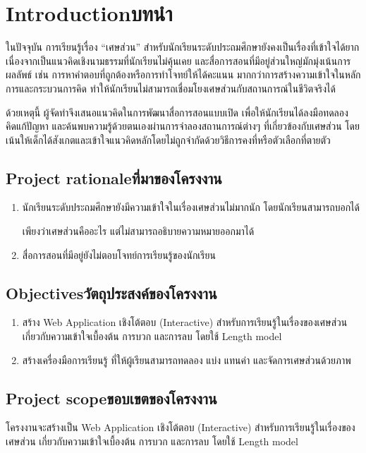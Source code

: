 \chapter{\ifenglish Introduction\else บทนำ\fi}
ในปัจจุบัน การเรียนรู้เรื่อง “เศษส่วน” สำหรับนักเรียนระดับประถมศึกษายังคงเป็นเรื่องที่เข้าใจได้ยาก เนื่องจากเป็นแนวคิดเชิงนามธรรมที่นักเรียนไม่คุ้นเคย และสื่อการสอนที่มีอยู่ส่วนใหญ่มักมุ่งเน้นการผลลัพธ์ เช่น การหาคำตอบที่ถูกต้องหรือการทำโจทย์ให้ได้คะแนน มากกว่าการสร้างความเข้าใจในหลักการและกระบวนการคิด ทำให้นักเรียนไม่สามารถเชื่อมโยงเศษส่วนกับสถานการณ์ในชีวิตจริงได้

ด้วยเหตุนี้ ผู้จัดทำจึงเสนอแนวคิดในการพัฒนาสื่อการสอนแบบเปิด เพื่อให้นักเรียนได้ลงมือทดลอง คิดแก้ปัญหา และค้นพบความรู้ด้วยตนเองผ่านการจำลองสถานการณ์ต่างๆ ที่เกี่ยวข้องกับเศษส่วน โดยเน้นให้เด็กได้สังเกตและเข้าใจแนวคิดหลักโดยไม่ถูกจำกัดด้วยวิธีการคงที่หรือตัวเลือกที่ตายตัว

\section{\ifenglish Project rationale\else ที่มาของโครงงาน\fi}
\begin{enumerate}
    \item นักเรียนระดับประถมศึกษายังมีความเข้าใจในเรื่องเศษส่วนไม่มากนัก โดยนักเรียนสามารถบอกได้
    
    เพียงว่าเศษส่วนคืออะไร แต่ไม่สามารถอธิบายความหมายออกมาได้
    \item สื่อการสอนที่มีอยู่ยังไม่ตอบโจทย์การเรียนรู้ของนักเรียน
\end{enumerate}

\section{\ifenglish Objectives\else วัตถุประสงค์ของโครงงาน\fi}
\begin{enumerate}
    \item สร้าง Web Application เชิงโต้ตอบ (Interactive) สำหรับการเรียนรู้ในเรื่องของเศษส่วน เกี่ยวกับความเข้าใจเบื้องต้น การบวก และการลบ โดยใช้ Length model
    \item สร้างเครื่องมือการเรียนรู้ ที่ให้ผู้เรียนสามารถทดลอง แบ่ง แทนค่า และจัดการเศษส่วนด้วยภาพ
\end{enumerate}

\section{\ifenglish Project scope\else ขอบเขตของโครงงาน\fi}
โครงงานจะสร้างเป็น Web Application เชิงโต้ตอบ (Interactive) สำหรับการเรียนรู้ในเรื่องของเศษส่วน เกี่ยวกับความเข้าใจเบื้องต้น การบวก และการลบ โดยใช้ Length model

